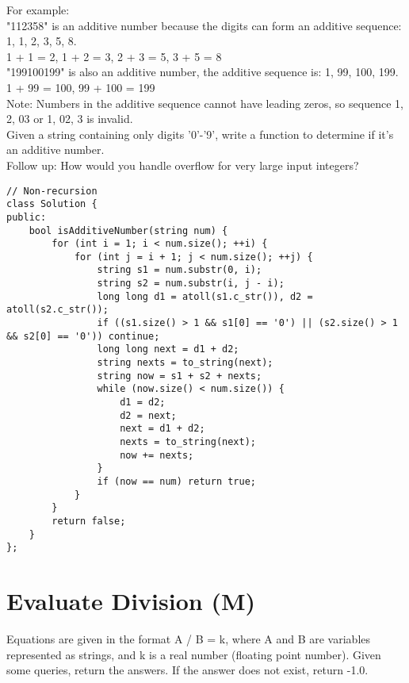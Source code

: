 For example:\\

"112358" is an additive number because the digits can form an additive sequence: 1, 1, 2, 3, 5, 8.\\
1 + 1 = 2, 1 + 2 = 3, 2 + 3 = 5, 3 + 5 = 8\\

"199100199" is also an additive number, the additive sequence is: 1, 99, 100, 199.\\
1 + 99 = 100, 99 + 100 = 199\\

Note: Numbers in the additive sequence cannot have leading zeros, so sequence 1, 2, 03 or 1, 02, 3 is invalid.\\

Given a string containing only digits '0'-'9', write a function to determine if it's an additive number.\\

Follow up:
How would you handle overflow for very large input integers? \\

\begin{lstlisting}
// Non-recursion
class Solution {
public:
    bool isAdditiveNumber(string num) {
        for (int i = 1; i < num.size(); ++i) {
            for (int j = i + 1; j < num.size(); ++j) {
                string s1 = num.substr(0, i);
                string s2 = num.substr(i, j - i);
                long long d1 = atoll(s1.c_str()), d2 = atoll(s2.c_str());
                if ((s1.size() > 1 && s1[0] == '0') || (s2.size() > 1 && s2[0] == '0')) continue;
                long long next = d1 + d2;
                string nexts = to_string(next);
                string now = s1 + s2 + nexts;
                while (now.size() < num.size()) {
                    d1 = d2;
                    d2 = next;
                    next = d1 + d2;
                    nexts = to_string(next);
                    now += nexts;
                }
                if (now == num) return true;
            }
        }
        return false;
    }
};
\end{lstlisting}


\section{Evaluate Division (M)}
Equations are given in the format A / B = k, where A and B are variables represented as strings, and k is a real number (floating point number). Given some queries, return the answers. If the answer does not exist, return -1.0.\\

